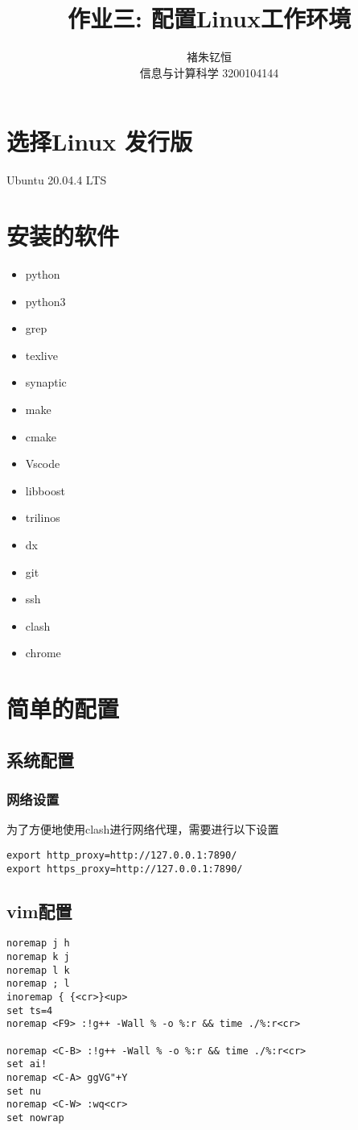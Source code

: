 \documentclass{article}
\title{作业三: 配置Linux工作环境}
\author{褚朱钇恒 \\ 信息与计算科学 3200104144}
\begin{document}
\maketitle

\section{选择Linux 发行版}
    Ubuntu 20.04.4 LTS
\section{安装的软件}
    \begin{itemize}
        \item python
        \item python3
        \item grep
        \item texlive
        \item synaptic
        \item make
        \item cmake
        \item Vscode
        \item libboost
        \item trilinos
        \item dx
        \item git
        \item ssh
        \item clash
        \item chrome
    \end{itemize}
\section{简单的配置}
    \subsection{系统配置}
        \subsubsection{网络设置}
        为了方便地使用clash进行网络代理，需要进行以下设置\cite{GlaDOS}
            \begin{verbatim}
export http_proxy=http://127.0.0.1:7890/
export https_proxy=http://127.0.0.1:7890/
            \end{verbatim}
        \subsection{vim配置}
            \begin{verbatim}
noremap j h
noremap k j
noremap l k
noremap ; l
inoremap { {<cr>}<up>
set ts=4
noremap <F9> :!g++ -Wall % -o %:r && time ./%:r<cr>

noremap <C-B> :!g++ -Wall % -o %:r && time ./%:r<cr>
set ai!
noremap <C-A> ggVG"+Y
set nu
noremap <C-W> :wq<cr>
set nowrap
            \end{verbatim}
\end{document}
